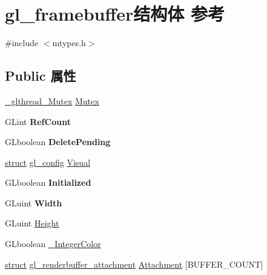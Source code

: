 \hypertarget{structgl__framebuffer}{}\section{gl\+\_\+framebuffer结构体 参考}
\label{structgl__framebuffer}


{\ttfamily \#include $<$mtypes.\+h$>$}

\subsection*{Public 属性}
\begin{DoxyCompactItemize}
\item 
\hyperlink{struct___c_r_i_t_i_c_a_l___s_e_c_t_i_o_n}{\+\_\+glthread\+\_\+\+Mutex} \hyperlink{structgl__framebuffer_aa6235e67026519c69cc955c2e90b87ce}{Mutex}
\item 
\mbox{\label{structgl__framebuffer_a5ec012d37a8e5386d9df47a490c54b70}} 
G\+Lint {\bfseries Ref\+Count}
\item 
\mbox{\label{structgl__framebuffer_a359a215cb14e501d52a50d6bea27250f}} 
G\+Lboolean {\bfseries Delete\+Pending}
\item 
\hyperlink{interfacestruct}{struct} \hyperlink{structgl__config}{gl\+\_\+config} \hyperlink{structgl__framebuffer_aa3ba32377612702a75b54ce1824ff9e0}{Visual}
\item 
\mbox{\label{structgl__framebuffer_a23e87e4fd761bf8696de4021c7fb431a}} 
G\+Lboolean {\bfseries Initialized}
\item 
\mbox{\label{structgl__framebuffer_a4d139dcb64062adbb1eaaf09890ebda4}} 
G\+Luint {\bfseries Width}
\item 
G\+Luint \hyperlink{structgl__framebuffer_ae5d2ed25f08fab458eeb6899119f94e5}{Height}
\item 
G\+Lboolean \hyperlink{structgl__framebuffer_ad59370bd850f01908152b0c17df5c847}{\+\_\+\+Integer\+Color}
\item 
\hyperlink{interfacestruct}{struct} \hyperlink{structgl__renderbuffer__attachment}{gl\+\_\+renderbuffer\+\_\+attachment} \hyperlink{structgl__framebuffer_a35ede5a6589db2944e338d025ec931bc}{Attachment} \mbox{[}B\+U\+F\+F\+E\+R\+\_\+\+C\+O\+U\+NT\mbox{]}
\item 

\end{DoxyCompactItemize}
